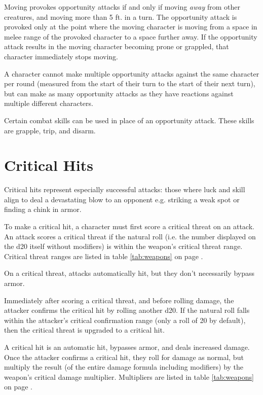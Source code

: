 \begin{multicols*}{2}
    Moving provokes opportunity attacks if and only if moving \textit{away}
    from other creatures, and moving more than 5 ft. in a turn. The opportunity
    attack is provoked only at the point where the moving character is moving
    from a space in melee range of the provoked character to a space further
    away. If the opportunity attack
    results in the moving character becoming prone or grappled, that character
    immediately stops moving.

    A character cannot make multiple opportunity attacks against the same
    character per round (measured from the start of their turn to the start
    of their next turn), but can make as many opportunity attacks as they have
    reactions against multiple different characters.

    Certain combat skills can be used in place of an opportunity attack. These
    skills are grapple, trip, and disarm.

    \section{Critical Hits}\label{combat:critical-hits}
    Critical hits represent especially successful attacks: those where luck and
    skill align to deal a devastating blow to an opponent e.g. striking a weak
    spot or finding a chink in armor.

    To make a critical hit, a character must first score a critical
    threat on an attack. An attack scores a critical
    threat if the natural roll (i.e. the number displayed on the d20 itself
    without modifiers) is within the weapon's critical threat
    range. Critical threat ranges are listed in
    table \ref{tab:weapons} on page \pageref{tab:weapons}.

    On a critical threat, attacks automatically hit, but they don't necessarily
    bypass armor.

    Immediately after scoring a critical threat, and before rolling damage, the
    attacker confirms the critical hit by rolling
    another d20. If the natural roll falls within the attacker's critical
    confirmation range (only a roll
    of 20 by default), then the critical threat is upgraded to a critical hit.

    A critical hit is an automatic hit, bypasses armor, and deals increased
    damage. Once the attacker confirms a critical hit, they roll for damage
    as normal, but multiply the result (of the entire damage formula including
    modifiers) by the weapon's critical damage
    multiplier. Multipliers are
    listed in table \ref{tab:weapons} on page \pageref{tab:weapons}.
\end{multicols*}
